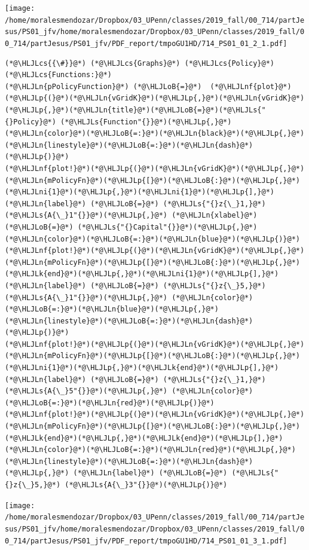 \documentclass[12pt,a4paper]{article}
\newcommand{\HLJLk}[1]{\textcolor[RGB]{148,91,176}{\textbf{#1}}}
\newcommand{\HLJLn}[1]{#1}
\newcommand{\HLJLnf}[1]{\textcolor[RGB]{66,102,213}{#1}}
\newcommand{\HLJLs}[1]{\textcolor[RGB]{201,61,57}{#1}}
\newcommand{\HLJLni}[1]{\textcolor[RGB]{59,151,46}{#1}}
\newcommand{\HLJLoB}[1]{\textcolor[RGB]{102,102,102}{\textbf{#1}}}
\newcommand{\HLJLp}[1]{#1}
\newcommand{\HLJLcs}[1]{\textcolor[RGB]{153,153,119}{\textit{#1}}}
\begin{document}
\texttt{[image: /home/moralesmendozar/Dropbox/03\_UPenn/classes/2019\_fall/00\_714/partJesus/PS01\_jfv/home/moralesmendozar/Dropbox/03\_UPenn/classes/2019\_fall/00\_714/partJesus/PS01\_jfv/PDF\_report/tmpoGU1HD/714\_PS01\_01\_2\_1.pdf]}

\begin{lstlisting}
(*@\HLJLcs{{\#}}@*) (*@\HLJLcs{Graphs}@*) (*@\HLJLcs{Policy}@*) (*@\HLJLcs{Functions:}@*)
(*@\HLJLn{pPolicyFunction}@*) (*@\HLJLoB{=}@*)  (*@\HLJLnf{plot}@*)(*@\HLJLp{(}@*)(*@\HLJLn{vGridK}@*)(*@\HLJLp{,}@*)(*@\HLJLn{vGridK}@*)(*@\HLJLp{,}@*)(*@\HLJLn{title}@*)(*@\HLJLoB{=}@*)(*@\HLJLs{"{}Policy}@*) (*@\HLJLs{Function"{}}@*)(*@\HLJLp{,}@*) (*@\HLJLn{color}@*)(*@\HLJLoB{=:}@*)(*@\HLJLn{black}@*)(*@\HLJLp{,}@*)(*@\HLJLn{linestyle}@*)(*@\HLJLoB{=:}@*)(*@\HLJLn{dash}@*)(*@\HLJLp{)}@*)
(*@\HLJLnf{plot!}@*)(*@\HLJLp{(}@*)(*@\HLJLn{vGridK}@*)(*@\HLJLp{,}@*) (*@\HLJLn{mPolicyFn}@*)(*@\HLJLp{[}@*)(*@\HLJLoB{:}@*)(*@\HLJLp{,}@*)(*@\HLJLni{1}@*)(*@\HLJLp{,}@*)(*@\HLJLni{1}@*)(*@\HLJLp{],}@*) (*@\HLJLn{label}@*) (*@\HLJLoB{=}@*) (*@\HLJLs{"{}z{\_}1,}@*) (*@\HLJLs{A{\_}1"{}}@*)(*@\HLJLp{,}@*) (*@\HLJLn{xlabel}@*) (*@\HLJLoB{=}@*) (*@\HLJLs{"{}Capital"{}}@*)(*@\HLJLp{,}@*) (*@\HLJLn{color}@*)(*@\HLJLoB{=:}@*)(*@\HLJLn{blue}@*)(*@\HLJLp{)}@*)
(*@\HLJLnf{plot!}@*)(*@\HLJLp{(}@*)(*@\HLJLn{vGridK}@*)(*@\HLJLp{,}@*) (*@\HLJLn{mPolicyFn}@*)(*@\HLJLp{[}@*)(*@\HLJLoB{:}@*)(*@\HLJLp{,}@*)(*@\HLJLk{end}@*)(*@\HLJLp{,}@*)(*@\HLJLni{1}@*)(*@\HLJLp{],}@*)(*@\HLJLn{label}@*) (*@\HLJLoB{=}@*) (*@\HLJLs{"{}z{\_}5,}@*) (*@\HLJLs{A{\_}1"{}}@*)(*@\HLJLp{,}@*) (*@\HLJLn{color}@*)(*@\HLJLoB{=:}@*)(*@\HLJLn{blue}@*)(*@\HLJLp{,}@*) (*@\HLJLn{linestyle}@*)(*@\HLJLoB{=:}@*)(*@\HLJLn{dash}@*)(*@\HLJLp{)}@*)
(*@\HLJLnf{plot!}@*)(*@\HLJLp{(}@*)(*@\HLJLn{vGridK}@*)(*@\HLJLp{,}@*) (*@\HLJLn{mPolicyFn}@*)(*@\HLJLp{[}@*)(*@\HLJLoB{:}@*)(*@\HLJLp{,}@*)(*@\HLJLni{1}@*)(*@\HLJLp{,}@*)(*@\HLJLk{end}@*)(*@\HLJLp{],}@*) (*@\HLJLn{label}@*) (*@\HLJLoB{=}@*) (*@\HLJLs{"{}z{\_}1,}@*) (*@\HLJLs{A{\_}5"{}}@*)(*@\HLJLp{,}@*) (*@\HLJLn{color}@*)(*@\HLJLoB{=:}@*)(*@\HLJLn{red}@*)(*@\HLJLp{)}@*)
(*@\HLJLnf{plot!}@*)(*@\HLJLp{(}@*)(*@\HLJLn{vGridK}@*)(*@\HLJLp{,}@*) (*@\HLJLn{mPolicyFn}@*)(*@\HLJLp{[}@*)(*@\HLJLoB{:}@*)(*@\HLJLp{,}@*)(*@\HLJLk{end}@*)(*@\HLJLp{,}@*)(*@\HLJLk{end}@*)(*@\HLJLp{],}@*) (*@\HLJLn{color}@*)(*@\HLJLoB{=:}@*)(*@\HLJLn{red}@*)(*@\HLJLp{,}@*) (*@\HLJLn{linestyle}@*)(*@\HLJLoB{=:}@*)(*@\HLJLn{dash}@*)(*@\HLJLp{,}@*) (*@\HLJLn{label}@*) (*@\HLJLoB{=}@*) (*@\HLJLs{"{}z{\_}5,}@*) (*@\HLJLs{A{\_}3"{}}@*)(*@\HLJLp{)}@*)
\end{lstlisting}

\texttt{[image: /home/moralesmendozar/Dropbox/03\_UPenn/classes/2019\_fall/00\_714/partJesus/PS01\_jfv/home/moralesmendozar/Dropbox/03\_UPenn/classes/2019\_fall/00\_714/partJesus/PS01\_jfv/PDF\_report/tmpoGU1HD/714\_PS01\_01\_3\_1.pdf]}
\end{document}
